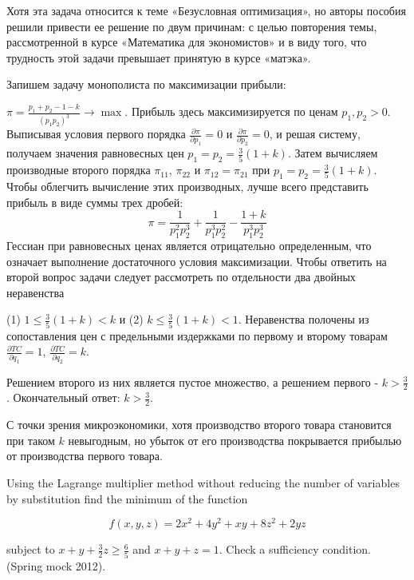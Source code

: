\begin{solution}
Хотя эта задача относится к теме «Безусловная оптимизация», но авторы пособия решили привести ее решение по двум причинам: с целью повторения темы, рассмотренной в курсе «Математика для экономистов» и в виду того, что трудность этой задачи превышает принятую в курсе «матэка».

Запишем задачу монополиста по максимизации прибыли:

$\pi =\frac{p_{1} +p_{2} -1-k}{(p_{1} p_{2} )^{3} } \to \max $. Прибыль здесь максимизируется по ценам $p_{1} ,p_{2} >0$. Выписывая условия первого порядка $\frac{\partial \pi }{\partial p_{1} } =0$ и $\frac{\partial \pi }{\partial p_{2} } =0$, и решая систему, получаем значения равновесных цен $p_{1} =p_{2} =\frac{3}{5} (1+k)$. Затем вычисляем производные второго порядка $\pi _{11} $, $\pi _{22} $ и $\pi _{12} =\pi _{21} $ при $p_{1} =p_{2} =\frac{3}{5} (1+k)$. Чтобы облегчить вычисление этих производных, лучше всего представить прибыль в виде суммы трех дробей:
\[
\pi =\frac{1}{p_{1}^{2} p_{2}^{3} } +\frac{1}{p_{1}^{3} p_{2}^{2} } -\frac{1+k}{p_{1}^{3} p_{2}^{3} } 
\] 
Гессиан при равновесных ценах является отрицательно определенным, что означает выполнение достаточного условия максимизации. Чтобы ответить на второй вопрос задачи следует рассмотреть по отдельности два двойных неравенства

(1) $1\le \frac{3}{5} (1+k)<k$ и (2) $k\le \frac{3}{5} (1+k)<1$. Неравенства полочены из сопоставления цен с предельными издержками по первому и второму товарам $\frac{\partial TC}{\partial q_1}=1$, $\frac{\partial TC}{\partial q_2}=k$.


Решением второго из них является пустое множество, а решением первого - $k>\frac{3}{2} $. Окончательный ответ: $k>\frac{3}{2} $.

С точки зрения микроэкономики, хотя производство второго товара становится при таком $k$ невыгодным, но убыток от его производства покрывается прибылью от производства первого товара.
\end{solution}


\begin{problem}
Using the Lagrange multiplier method without reducing the number of variables by substitution find the minimum of the function

\[f(x,y,z)=2x^{2} +4y^{2} +xy+8z^{2} +2yz\] 

subject to $x+y+\frac{3}{2} z\ge \frac{6}{5} $ and $x+y+z=1$. Check a sufficiency condition. (Spring mock 2012).
\end{problem}

